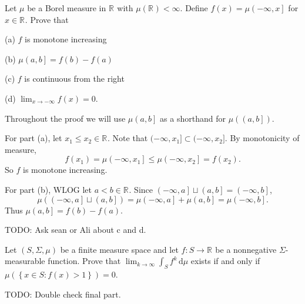 
\begin{problem}{1}
  Let $\mu$ be a Borel measure in $\mathbb{R}^{}$ with $\mu\left( \mathbb{R}^{} \right) < \infty$.
  Define $f\left( x \right) = \mu\left( - \infty, x  \right]$ for $x \in \mathbb{R}^{}$.
  Prove that

  (a) $f$ is monotone increasing

  (b) $\mu \left( a,b \right] = f\left( b \right) - f\left( a \right)$

  (c) $f$ is continuous from the right

  (d) $\lim_{x \to -\infty} f\left( x  \right) = 0$.
\end{problem}

\begin{solution}
  Throughout the proof we will use $\mu\left( a,b \right]$ as a shorthand for $\mu\left( \left( a,b \right] \right)$.

  For part (a), let $x_{1} \leq x_{2} \in \mathbb{R}^{}$.
  Note that $(-\infty, x_{1}] \subset (-\infty, x_{2}]$.
  By monotonicity of measure,
  \[
    f\left( x_{1} \right) = \mu \left( -\infty, x_{1} \right] \leq \mu \left( -\infty, x_{2} \right] = f\left( x_{2} \right)
  .\] 
  So $f$ is monotone increasing.

  For part (b), WLOG let $a < b \in \mathbb{R}^{}$.
  Since $\left( -\infty, a \right] \sqcup \left( a,b \right] = \left( -\infty,b \right]$, 
  \[
    \mu \left( \left( -\infty, a \right] \sqcup \left( a,b \right] \right) = \mu \left( -\infty, a \right] + \mu \left( a,b \right] = \mu \left( -\infty, b \right]
  .\] 
  Thus $\mu\left( a,b \right] = f\left( b \right) - f\left( a \right)$.

  TODO: Ask sean or Ali about c and d.
\end{solution}

\pagebreak

\begin{problem}{2}
  Let $\left( S, \Sigma, \mu \right)$ be a finite measure space and let $f : S \to \mathbb{R}^{} $ be a nonnegative $\Sigma$-measurable function.
  Prove that $\lim_{k \to \infty} \int_{S} \! f^{k} \, \mathrm{d}\mu $ exists if and only if \\
  $\mu\left( \left\{ x \in S : f(x) > 1 \right\} \right) = 0$.
\end{problem}
    
\begin{solution}
  TODO: Double check final part.
\end{solution}

